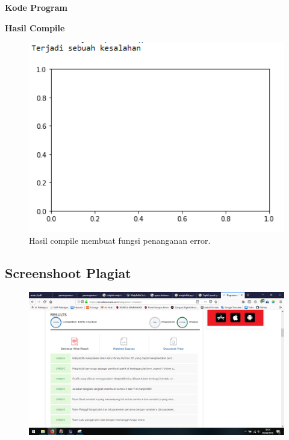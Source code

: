 \hfill \break
\textbf{Kode Program}



\hfill \break
\textbf{Hasil Compile}

\begin{figure}[H]
	\includegraphics[width=12cm]{figures/6/Praktek/1174039/error.png}
	\centering
	\caption{Hasil compile membuat fungsi penanganan error.}
\end{figure}

\subsection{Screenshoot Plagiat}
\begin{figure}[H]
	\includegraphics[width=12cm]{figures/6/Praktek/1174039/plagiat.png}
	\centering
\end{figure}
